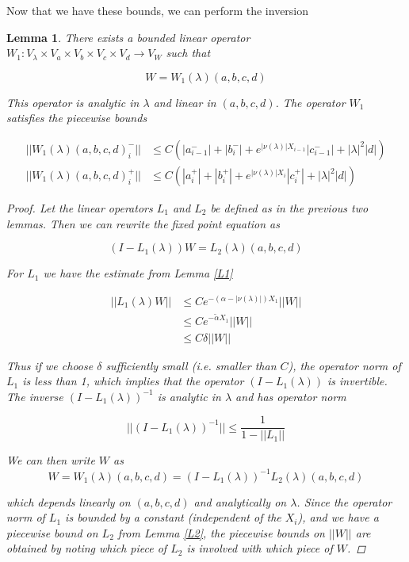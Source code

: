 \documentclass[12pt]{article}
\newtheorem{lemma}{Lemma}
\begin{document}
Now that we have these bounds, we can perform the inversion


\begin{lemma}\label{W1}
There exists a bounded linear operator $W_1: V_\lambda \times V_a \times V_b \times V_c \times V_d \rightarrow V_W$ such that 

\[
W = W_1(\lambda)(a,b,c,d)
\]

This operator is analytic in $\lambda$ and linear in $(a, b, c, d)$. The operator $W_1$ satisfies the piecewise bounds

\begin{align*}
||W_1(\lambda)(a,b,c,d)_i^-|| &\leq C ( |a_{i-1}^-| + |b_i^-| + e^{|\nu(\lambda)|X_{i-1}}|c_{i-1}^-| + |\lambda|^2 |d| ) \\
||W_1(\lambda)(a,b,c,d)_i^+|| &\leq C ( |a_i^+| + |b_i^+| + e^{|\nu(\lambda)|X_i}|c_i^+| + |\lambda|^2 |d| )
\end{align*}

\begin{proof}
Let the linear operators $L_1$ and $L_2$ be defined as in the previous two lemmas. Then we can rewrite the fixed point equation as

\[
(I - L_1(\lambda))W = L_2(\lambda)(a,b,c,d)
\]

For $L_1$ we have the estimate from Lemma \ref{L1}

\begin{align*}
||L_1(\lambda)W|| &\leq C e^{-(\alpha -|\nu(\lambda)|)X_1}||W|| \\
&\leq C e^{-\tilde{\alpha} X_1}||W|| \\
&\leq C \delta ||W||
\end{align*}

Thus if we choose $\delta$ sufficiently small (i.e. smaller than $C$), the operator norm of $L_1$ is less than 1, which implies that the operator $(I - L_1(\lambda))$ is invertible. The inverse $(I - L_1(\lambda))^{-1}$ is analytic in $\lambda$ and has operator norm 

\[
||(I - L_1(\lambda))^{-1}|| \leq \frac{1}{1 - ||L_1||}
\]

We can then write $W$ as
\[
W = W_1(\lambda)(a,b,c,d) = (I - L_1(\lambda))^{-1} L_2(\lambda)(a,b,c,d)
\]

which depends linearly on $(a,b,c,d)$ and analytically on $\lambda$. Since the operator norm of $L_1$ is bounded by a constant (independent of the $X_i$), and we have a piecewise bound on $L_2$ from Lemma \ref{L2}, the piecewise bounds on $||W||$ are obtained by noting which piece of $L_2$ is involved with which piece of $W$.

\end{proof}
\end{lemma}
\end{document}
